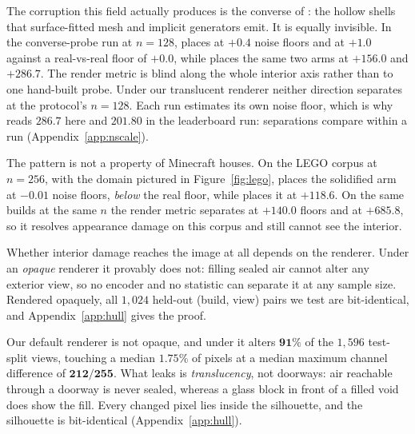 The corruption this field actually produces is the converse of \solidify{}: the hollow
shells that surface-fitted mesh and implicit generators emit. It is equally invisible. In
the converse-probe run at $n{=}128$, \mvkid{} places \hollow{} at $+0.4$ noise floors and
\solidify{} at $+1.0$ against a real-vs-real floor of $+0.0$, while \vkid{} places the same
two arms at $+156.0$ and $+286.7$. The render metric is blind along the whole interior axis
rather than to one hand-built probe. Under our translucent renderer neither direction
separates at the protocol's $n{=}128$. Each run estimates its own noise floor, which is why \solidify{}
reads $286.7$ here and $201.80$ in the leaderboard run: separations compare within a run
(Appendix~\ref{app:nscale}).

\label{sec:lego}The pattern is not a property of Minecraft houses. On the LEGO corpus at
$n{=}256$, with the domain pictured in Figure~\ref{fig:lego}, \mvkid{} places the solidified arm at $\mathbf{-0.01}$
noise floors, \emph{below} the real floor, while \vkid{} places it at $\mathbf{+118.6}$. On
the same builds at the same $n$ the render metric separates \matshuffle{} at
$\mathbf{+140.0}$ floors and \monochrome{} at $\mathbf{+685.8}$, so it resolves appearance
damage on this corpus and still cannot see the interior.

Whether interior damage reaches the image at all depends on the renderer. Under an
\emph{opaque} renderer it provably does not: filling sealed air cannot alter any exterior
view, so no encoder and no statistic can separate it at any sample size. Rendered opaquely,
all $1{,}024$ held-out (build, view) pairs we test are bit-identical, and
Appendix~\ref{app:hull} gives the proof.

Our default renderer is not opaque, and under it \solidify{} alters $\mathbf{91\%}$ of the
$1{,}596$ test-split views, touching a median $1.75\%$ of pixels at a median maximum
channel difference of $\mathbf{212/255}$. What leaks is \emph{translucency}, not doorways:
air reachable through a doorway is never sealed, whereas a glass block in front of a filled
void does show the fill. Every changed pixel lies inside the silhouette, and the silhouette
is bit-identical (Appendix~\ref{app:hull}).

